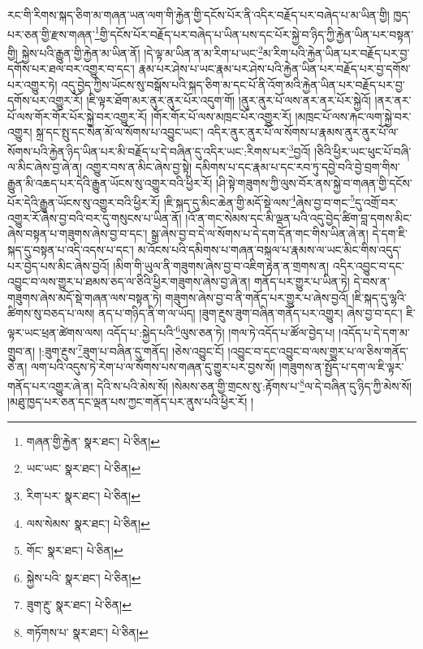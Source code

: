 རང་གི་རིགས་སྐད་ཅིག་མ་གཞན་ཡན་ལག་གི་རྐྱེན་གྱི་དངོས་པོར་ནི་འདིར་བརྗོད་པར་བཞེད་པ་མ་ཡིན་གྱི། ཁྱད་པར་ཅན་གྱི་རྫས་གཞན་\footnote{གཞན་གྱི་རྐྱེན་  སྣར་ཐང་།  པེ་ཅིན། }གྱི་དངོས་པོར་བརྗོད་པར་བཞེད་པ་ཡིན་པས་དང་པོར་སྐྱེ་བ་ཉིད་ཀྱི་རྐྱེན་ཡིན་པར་བསྟན་གྱི། སྐྱེས་པའི་རྒྱུན་གྱི་རྐྱེན་མ་ཡིན་ནོ། །དེ་ལྟ་མ་ཡིན་ན་མ་རིག་པ་ཡང་\footnote{ཡང་ཡང་  སྣར་ཐང་།  པེ་ཅིན། }མ་རིག་པའི་རྐྱེན་ཡིན་པར་བརྗོད་པར་བྱ་དགོས་པར་ཐལ་བར་འགྱུར་བ་དང་། རྣམ་པར་ཤེས་པ་ཡང་རྣམ་པར་ཤེས་པའི་རྐྱེན་ཡིན་པར་བརྗོད་པར་བྱ་དགོས་པར་འགྱུར་ཏེ། འདུ་བྱེད་ཀྱིས་ཡོངས་སུ་བསྒོས་པའི་སྐད་ཅིག་མ་དང་པོ་ནི་འོག་མའི་རྐྱེན་ཡིན་པར་བརྗོད་པར་བྱ་དགོས་པར་འགྱུར་རོ། །ཇི་ལྟར་ཐོག་མར་ནུར་ནུར་པོར་འདུག་གོ། །ནུར་ནུར་པོ་ལས་ནར་ནར་པོར་སྐྱེའོ། །ནར་ནར་པོ་ལས་གོར་གོར་པོར་སྐྱེ་བར་འགྱུར་རོ། །གོར་གོར་པོ་ལས་མཁྲང་པོར་འགྱུར་རོ། །མཁྲང་པོ་ལས་རྐང་ལག་སྐྱེ་བར་འགྱུར། སྐྲ་དང་སྤུ་དང་སེན་མོ་ལ་སོགས་པ་འབྱུང་ཡང་། འདིར་ནུར་ནུར་པོ་ལ་སོགས་པ་རྣམས་ནུར་ནུར་པོ་ལ་སོགས་པའི་རྐྱེན་ཉིད་ཡིན་པར་མི་བརྗོད་པ་དེ་བཞིན་དུ་འདིར་ཡང་:རིགས་པར་\footnote{རིག་པར་  སྣར་ཐང་།  པེ་ཅིན། }བྱའོ། །ཅིའི་ཕྱིར་ཡང་ཕུང་པོ་བཞི་ལ་མིང་ཞེས་བྱ་ཞེ་ན། འགྱུར་བས་ན་མིང་ཞེས་བྱ་སྟེ། དམིགས་པ་དང་རྣམ་པ་དང་རབ་ཏུ་དབྱེ་བའི་བྱེ་བྲག་གིས་རྒྱུན་མི་འཆད་པར་དེའི་རྒྱུན་ཡོངས་སུ་འགྱུར་བའི་ཕྱིར་རོ། །ཤི་སྟེ་གཟུགས་ཀྱི་ལུས་བོར་ནས་སྐྱེ་བ་གཞན་གྱི་དངོས་པོར་དེའི་རྒྱུན་ཡོངས་སུ་འགྱུར་བའི་ཕྱིར་རོ། །ཇི་སྐད་དུ་མིང་ཆེན་གྱི་མདོ་སྡེ་ལས་\footnote{ལས་སེམས་  སྣར་ཐང་།  པེ་ཅིན། }ཞེས་བྱ་བ་གང་\footnote{གོང་  སྣར་ཐང་།  པེ་ཅིན། }དུ་འགྲོ་བར་འགྱུར་རོ་ཞེས་བྱ་བའི་བར་དུ་གསུངས་པ་ཡིན་ནོ། །འོ་ན་གང་སེམས་དང་མི་ལྡན་པའི་འདུ་བྱེད་ཚིག་བླ་དགས་མིང་ཞེས་བསྟན་པ་གཟུགས་ཞེས་བྱ་བ་དང་། སྒྲ་ཞེས་བྱ་བ་དེ་ལ་སོགས་པ་དེ་དག་དོན་གང་གིས་ཡིན་ཞེ་ན། དེ་དག་ཇི་སྐད་དུ་བསྟན་པ་འདི་འདས་པ་དང་། མ་འོངས་པའི་དམིགས་པ་གཞན་བསྐལ་པ་རྣམས་ལ་ཡང་མིང་གིས་འདུད་པར་བྱེད་པས་མིང་ཞེས་བྱའོ། །མིག་གི་ཡུལ་ནི་གཟུགས་ཞེས་བྱ་བ་འཇིག་རྟེན་ན་གྲགས་ན། འདིར་འབྱུང་བ་དང་འབྱུང་བ་ལས་གྱུར་པ་ཐམས་ཅད་ལ་ཅིའི་ཕྱིར་གཟུགས་ཞེས་བྱ་ཞེ་ན། གནོད་པར་གྱུར་པ་ཡིན་ཏེ། དེ་བས་ན་གཟུགས་ཞེས་མདོ་སྡེ་གཞན་ལས་བསྟན་ཏེ། གཟུགས་ཞེས་བྱ་བ་ནི་གནོད་པར་གྱུར་པ་ཞེས་བྱའོ། །ཇི་སྐད་དུ་ལྷའི་ཚིགས་སུ་བཅད་པ་ལས། ནད་པ་གཉིད་ནི་ག་ལ་ཡོད། །ཟུག་རྔུས་ཟུག་བཞིན་གནོད་པར་འགྱུར། ཞེས་བྱ་བ་དང་། ཇི་ལྟར་ཡང་ཕྲན་ཚེགས་ལས། འདོད་པ་:སྐྱེད་པའི་\footnote{སྐྱེས་པའི་  སྣར་ཐང་།  པེ་ཅིན། }ལུས་ཅན་ཏེ། །གལ་ཏེ་འདོད་པ་ཚོལ་བྱེད་པ། །འདོད་པ་དེ་དག་མ་གྲུབ་ན། །:ཟུག་རྔུས་\footnote{ཟུག་རྔུ་  སྣར་ཐང་།  པེ་ཅིན། }ཟུག་པ་བཞིན་དུ་གནོད། །ཅེས་འབྱུང་ངོ། །འབྱུང་བ་དང་འབྱུང་བ་ལས་གྱུར་པ་ལ་ཅིས་གནོད་ཅེ་ན། ལག་པའི་འདུས་ཏེ་རེག་པ་ལ་སོགས་པས་གཞན་དུ་གྱུར་པར་བྱས་སོ། །གཟུགས་ན་སྤྱོད་པ་དག་ལ་ཇི་ལྟར་གནོད་པར་འགྱུར་ཞེ་ན། དེའི་ས་པའི་མེས་སོ། །སེམས་ཅན་གྱི་གྲངས་སུ་:རྟོགས་པ་\footnote{གཏོགས་པ་  སྣར་ཐང་།  པེ་ཅིན། }ལ་དེ་བཞིན་དུ་ཉིད་ཀྱི་མེས་སོ། །མཐུ་ཁྱད་པར་ཅན་དང་ལྡན་པས་ཀྱང་གནོད་པར་ནུས་པའི་ཕྱིར་རོ། །
